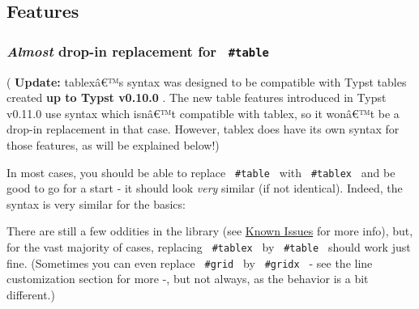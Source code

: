 \subsection{Features}\label{features}

\subsubsection{\texorpdfstring{\emph{Almost} drop-in replacement for
\texttt{\ \#table\ }}{Almost drop-in replacement for  \#table }}\label{almost-drop-in-replacement-for-table}

( \textbf{Update:} tablexâ€™s syntax was designed to be compatible with
Typst tables created \textbf{up to Typst v0.10.0} . The new table
features introduced in Typst v0.11.0 use syntax which isnâ€™t compatible
with tablex, so it wonâ€™t be a drop-in replacement in that case.
However, tablex does have its own syntax for those features, as will be
explained below!)

In most cases, you should be able to replace \texttt{\ \#table\ } with
\texttt{\ \#tablex\ } and be good to go for a start - it should look
\emph{very} similar (if not identical). Indeed, the syntax is very
similar for the basics:

\begin{Shaded}
\begin{Highlighting}[]

\NormalTok{  [a], [b], [c], [d],}
\NormalTok{  [e], [f], [g], [h],}
\NormalTok{  [i], [j], [k], [l]}
\NormalTok{)}
\end{Highlighting}
\end{Shaded}


There are still a few oddities in the library (see
\href{https://github.com/typst/packages/raw/main/packages/preview/tablex/0.0.9/\#known-issues}{Known
Issues} for more info), but, for the vast majority of cases, replacing
\texttt{\ \#tablex\ } by \texttt{\ \#table\ } should work just fine.
(Sometimes you can even replace \texttt{\ \#grid\ } by
\texttt{\ \#gridx\ } - see the line customization section for more -,
but not always, as the behavior is a bit different.)

